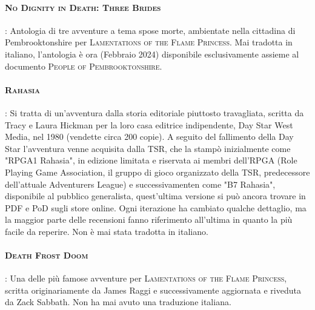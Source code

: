 \paragraph{\textsc{No Dignity in Death: Three Brides}}: Antologia di tre avventure a tema spose morte, ambientate nella cittadina di Pembrooktonshire per \textsc{Lamentations of the Flame Princess}. Mai tradotta in italiano, l'antologia è ora (Febbraio 2024) disponibile esclusivamente assieme al documento \textsc{People of Pembrooktonshire}.

\paragraph{\textsc{Rahasia}}: Si tratta di un'avventura dalla storia editoriale piuttosto travagliata, scritta da Tracy e Laura Hickman per la loro casa editrice indipendente, Day Star West Media, nel 1980 (vendette circa 200 copie). A seguito del fallimento della Day Star l'avventura venne acquisita dalla TSR, che la stampò inizialmente come "RPGA1 Rahasia", in edizione limitata e riservata ai membri dell'RPGA (Role Playing Game Association, il gruppo di gioco organizzato della TSR, predecessore dell'attuale Adventurers League) e successivamenten come "B7 Rahasia", disponibile al pubblico generalista, quest'ultima versione si può ancora trovare in PDF e PoD sugli store online. Ogni iterazione ha cambiato qualche dettaglio, ma la maggior parte delle recensioni fanno riferimento all'ultima in quanto la più facile da reperire. Non è mai stata tradotta in italiano.

\paragraph{\textsc{Death Frost Doom}}: Una delle più famose avventure per \textsc{Lamentations of the Flame Princess}, scritta originariamente da James Raggi e successivamente aggiornata e riveduta da Zack Sabbath. Non ha mai avuto una traduzione italiana.